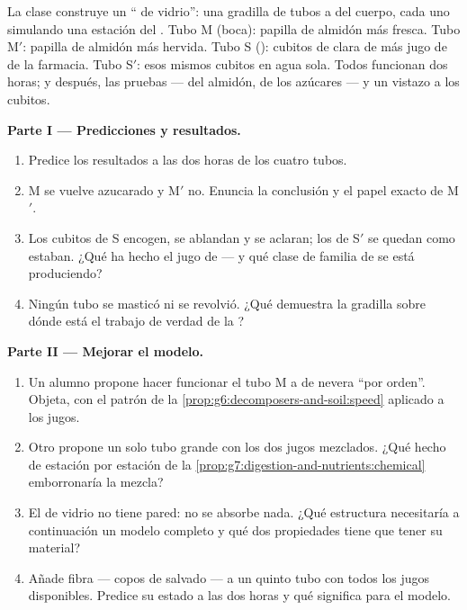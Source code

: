 \begin{problem}\label{pb:g7:digestion-and-nutrients:1}
La clase construye un `` de vidrio'': una gradilla de
tubos a  del cuerpo, cada uno simulando una estación del
. Tubo M (boca): papilla de almidón más  fresca.
Tubo M$'$: papilla de almidón más  hervida. Tubo S ():
cubitos de clara de  más jugo de  de la farmacia. Tubo
S$'$: esos mismos cubitos en agua sola. Todos funcionan dos horas; y
después, las pruebas --- del almidón, de los azúcares --- y un vistazo
a los cubitos.

\medskip\noindent\textbf{Parte I --- Predicciones y resultados.}
\begin{enumerate}
  \item Predice los resultados a las dos horas de los cuatro tubos.
  \item M se vuelve azucarado y M$'$ no. Enuncia la conclusión y el
        papel exacto de M$'$.
  \item Los cubitos de S encogen, se ablandan y se aclaran; los de
        S$'$ se quedan como estaban. ¿Qué ha hecho el jugo de 
        --- y qué clase de familia de  se está produciendo?
  \item Ningún tubo se masticó ni se revolvió. ¿Qué demuestra la
        gradilla sobre dónde está el trabajo de verdad de la ?
\end{enumerate}

\medskip\noindent\textbf{Parte II --- Mejorar el modelo.}
\begin{enumerate}[resume]
  \item Un alumno propone hacer funcionar el tubo M a  de
        nevera ``por orden''. Objeta, con el patrón de la
        \cref{prop:g6:decomposers-and-soil:speed} aplicado a los jugos.
  \item Otro propone un solo tubo grande con los dos jugos mezclados.
        ¿Qué hecho de estación por estación de la
        \cref{prop:g7:digestion-and-nutrients:chemical} emborronaría la
        mezcla?
  \item El  de vidrio no tiene pared: no se absorbe nada.
        ¿Qué estructura necesitaría a continuación un modelo completo y
        qué dos propiedades tiene que tener su material?
  \item Añade fibra --- copos de salvado --- a un quinto tubo con todos
        los jugos disponibles. Predice su estado a las dos horas y qué
        significa para el modelo.
\end{enumerate}


\end{problem}
